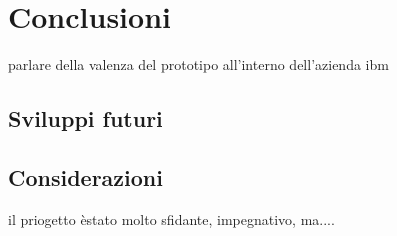 \chapter{Conclusioni}
parlare della valenza del prototipo all'interno dell'azienda ibm
\section{Sviluppi futuri}
\section{Considerazioni}

il priogetto èstato molto sfidante, impegnativo, ma....
